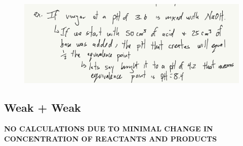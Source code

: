 \documentclass{article}
\begin{document}
\begin{enumerate}
\begin{figure}
\includegraphics[width=\textwidth]{4.6fig4.png}
\end{figure}

\subsection{Weak + Weak}
\textbf{NO CALCULATIONS DUE TO MINIMAL CHANGE IN CONCENTRATION OF REACTANTS AND PRODUCTS}

\end{enumerate}
\end{document}
